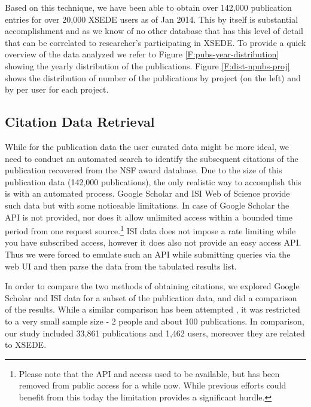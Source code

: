 \documentclass{sig-alternate}
\begin{document}
Based on this technique, we have been able to obtain over 142,000 publication entries for over 20,000 XSEDE users as of Jan 2014.  This by itself is substantial accomplishment and as we know of no other database that has this level of detail that can be correlated to researcher's participating in XSEDE. To provide a quick overview of the data analyzed we refer to Figure \ref{F:pubs-year-distribution} showing the yearly distribution of the publications. Figure \ref{F:dist-npubs-proj} shows the distribution of number of the publications by project (on the left) and by per user for each project. 
 
\subsection{Citation Data Retrieval} 
 
While for the publication data the user curated data might be more ideal, we need to conduct an automated search to identify the subsequent citations of the publication recovered from the NSF award database. 
Due to the size of this publication data (142,000 publications), the only realistic way to accomplish this is with an automated process. Google Scholar and ISI Web of Science provide such data but with some noticeable limitations. In case of Google Scholar the API is not provided, nor does it allow unlimited access within a bounded time period from one request source.\footnote{Please note that the API and access used to be available, but has been removed from public access for a while now. While previous efforts could benefit from this today the limitation provides a significant hurdle.} ISI data does not impose a rate limiting while you have subscribed access, however it does also not provide an easy access API. Thus we were forced to emulate such an API while submitting queries via the web UI and then parse the data from the tabulated results list. 
 
In order to compare the two methods of obtaining citations, we explored Google Scholar and ISI data for a subset of the publication data, and did a comparison of the results. While a similar comparison has been attempted \cite{yang2006citation}, it was restricted to a very small sample size - 2 people and about 100 publications. In comparison, our study included 33,861 publications and 1,462 users, moreover they are related to XSEDE.
 
\end{document}
